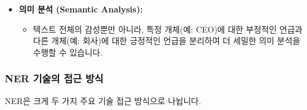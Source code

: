 \documentclass[11pt,a4paper]{article}
\begin{document}
\begin{itemize}
\begin{itemize}
        \end{itemize}
    \item \textbf{의미 분석 (Semantic Analysis):}
        \begin{itemize}
            \item 텍스트 전체의 감성뿐만 아니라, 특정 개체(예: CEO)에 대한 부정적인 언급과 다른 개체(예: 회사)에 대한 긍정적인 언급을 분리하여 더 세밀한 의미 분석을 수행할 수 있습니다.
        \end{itemize}
\end{itemize}

\subsubsection*{NER 기술의 접근 방식}
NER은 크게 두 가지 주요 기술 접근 방식으로 나뉩니다.
\end{document}
